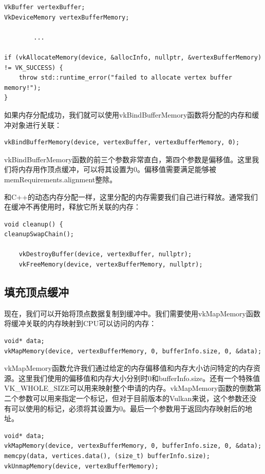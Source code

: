 \documentclass{ctexart}
\begin{document}
\begin{lstlisting}[language={[ANSI]C}]
VkBuffer vertexBuffer;
VkDeviceMemory vertexBufferMemory;

		...

if (vkAllocateMemory(device, &allocInfo, nullptr, &vertexBufferMemory) != VK_SUCCESS) {
	throw std::runtime_error("failed to allocate vertex buffer memory!");
}
\end{lstlisting}

如果内存分配成功，我们就可以使用vkBindBufferMemory函数将分配的内存和缓冲对象进行关联：

\begin{lstlisting}[language={[ANSI]C}]
vkBindBufferMemory(device, vertexBuffer, vertexBufferMemory, 0);
\end{lstlisting}

vkBindBufferMemory函数的前三个参数非常直白，第四个参数是偏移值。这里我们将内存用作顶点缓冲，可以将其设置为0。偏移值需要满足能够被memRequirements.alignment整除。

和C++的动态内存分配一样，这里分配的内存需要我们自己进行释放。通常我们在缓冲不再使用时，释放它所关联的内存：

\begin{lstlisting}[language={[ANSI]C}]
void cleanup() {
cleanupSwapChain();

	vkDestroyBuffer(device, vertexBuffer, nullptr);
	vkFreeMemory(device, vertexBufferMemory, nullptr);
\end{lstlisting}

\subsection{填充顶点缓冲}

现在，我们可以开始将顶点数据复制到缓冲中。我们需要使用vkMapMemory函数将缓冲关联的内存映射到CPU可以访问的内存：

\begin{lstlisting}[language={[ANSI]C}]
void* data;
vkMapMemory(device, vertexBufferMemory, 0, bufferInfo.size, 0, &data);
\end{lstlisting}

vkMapMemory函数允许我们通过给定的内存偏移值和内存大小访问特定的内存资源。这里我们使用的偏移值和内存大小分别时0和bufferInfo.size。还有一个特殊值VK\_WHOLE\_SIZE可以用来映射整个申请的内存。vkMapMemory函数的倒数第二个参数可以用来指定一个标记，但对于目前版本的Vulkan来说，这个参数还没有可以使用的标记，必须将其设置为0。最后一个参数用于返回内存映射后的地址。

\begin{lstlisting}[language={[ANSI]C}]
void* data;
vkMapMemory(device, vertexBufferMemory, 0, bufferInfo.size, 0, &data);
memcpy(data, vertices.data(), (size_t) bufferInfo.size);
vkUnmapMemory(device, vertexBufferMemory);
\end{lstlisting}
\end{document}
